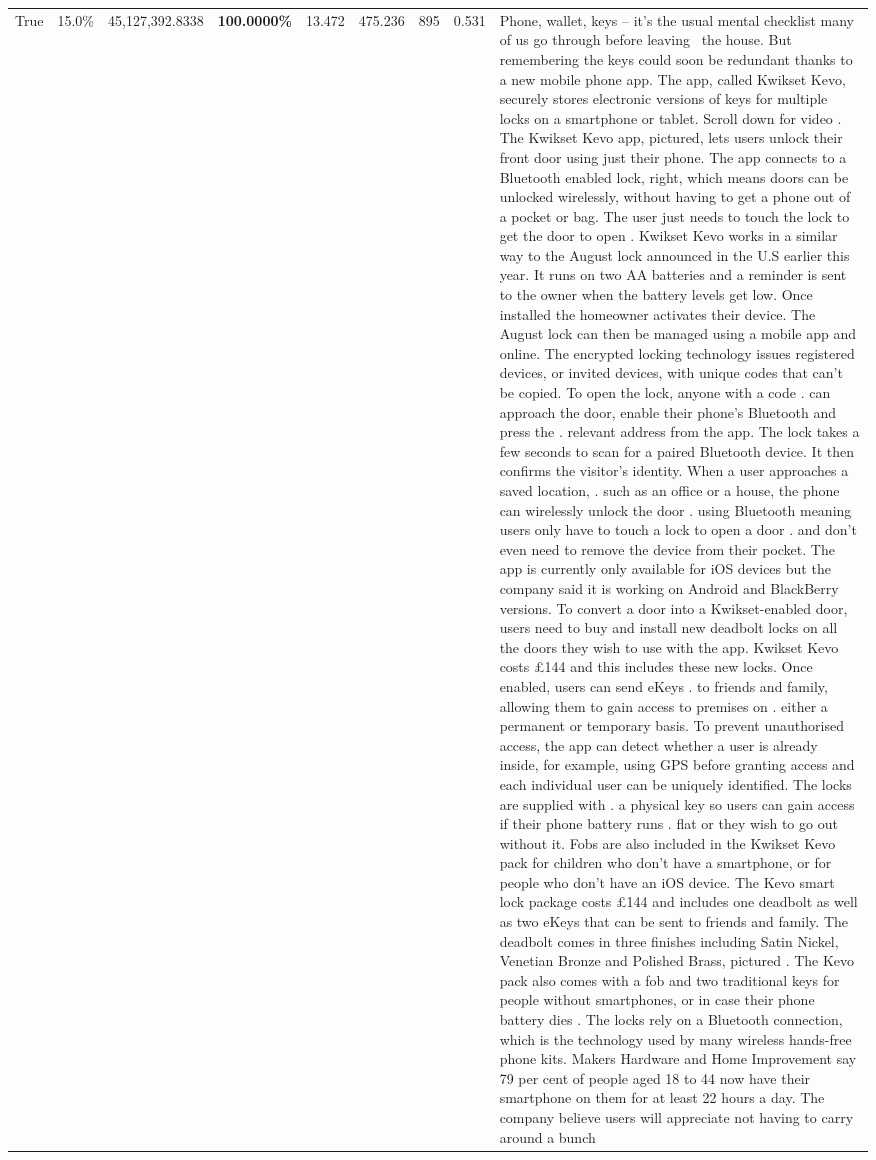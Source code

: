\begin{table}[H]
\begin{tabular}{lllrlllll}
True & 15.0\% & 45,127,392.8338 & \bfseries \color{red} 100.0000\% & 13.472 & 475.236 & 895 & 0.531 & Phone, wallet, keys – it’s the usual mental checklist many of us go through before leaving  the house. But remembering the keys could soon be redundant thanks to a new mobile phone app. The app, called Kwikset Kevo, securely stores electronic versions of keys for multiple locks on a smartphone or tablet. Scroll down for video . The Kwikset Kevo app, pictured, lets users unlock their front door using just their phone. The app connects to a Bluetooth enabled lock, right, which means doors can be unlocked wirelessly, without having to get a phone out of a pocket or bag. The user just needs to touch the lock to get the door to open . Kwikset Kevo works in a similar way to the August lock announced in the U.S earlier this year. It runs on two AA batteries and a reminder is sent to the owner when the battery levels get low. Once installed the homeowner activates their device. The August lock can then be managed using a mobile app and online. The encrypted locking technology issues registered devices, or invited devices, with unique codes that can't be copied. To open the lock, anyone with a code . can approach the door, enable their phone's Bluetooth and press the . relevant address from the app. The lock takes a few seconds to scan for a paired Bluetooth device. It then confirms the visitor's identity. When a user approaches a saved location, . such as an office or a house, the phone can wirelessly unlock the door . using Bluetooth meaning users only have to touch a lock to open a door . and don't even need to remove the device from their pocket. The app is currently only available for iOS devices but the company said it is working on Android and BlackBerry versions. To convert a door into a Kwikset-enabled door, users need to buy and install new deadbolt locks on all the doors they wish to use with the app. Kwikset Kevo costs £144 and this includes these new locks. Once enabled, users can send eKeys . to friends and family, allowing them to gain access to premises on . either a permanent or temporary basis. To prevent unauthorised access, the app can detect whether a user is already inside, for example, using GPS before granting access and each individual user can be uniquely identified. The locks are supplied with . a physical key so users can gain access if their phone battery runs . flat or they wish to go out without it. Fobs are also included in the Kwikset Kevo pack for children who don't have a smartphone, or for people who don't have an iOS device. The Kevo smart lock package costs £144 and includes one deadbolt as well as two eKeys that can be sent to friends and family. The deadbolt comes in three finishes including Satin Nickel, Venetian Bronze and Polished Brass, pictured . The Kevo pack also comes with a fob and two traditional keys for people without smartphones, or in case their phone battery dies . The locks rely on a Bluetooth connection, which is the technology used by many wireless hands-free phone kits. Makers Hardware and Home Improvement say 79 per cent of people aged 18 to 44 now have their smartphone on them for at least 22 hours a day. The company believe users will appreciate not having to carry around a bunch 
\end{tabular}
\end{table}
